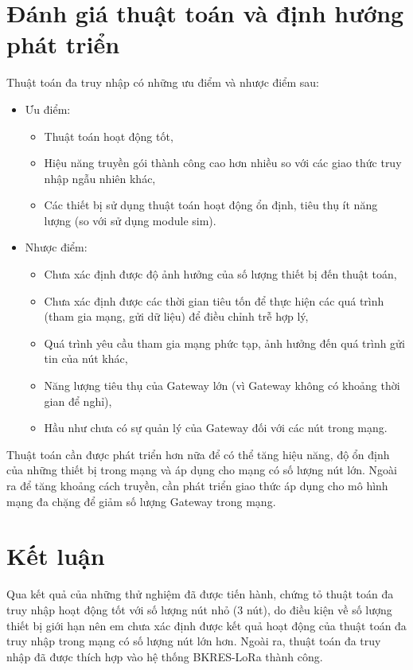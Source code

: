 \section{Đánh giá thuật toán và định hướng phát triển}
Thuật toán đa truy nhập có những ưu điểm và nhược điểm sau:
\begin{itemize}
\item Ưu điểm:
	\begin{itemize}
	\item	Thuật toán hoạt động tốt,
	\item	Hiệu năng truyền gói thành công cao hơn nhiều so với các giao thức truy nhập ngẫu nhiên khác,
	\item	Các thiết bị sử dụng thuật toán hoạt động ổn định, tiêu thụ ít năng lượng (so với sử dụng module sim).
	\end{itemize}
\item Nhược điểm:
	\begin{itemize}
	\item 	Chưa xác định được độ ảnh hưởng của số lượng thiết bị đến thuật toán,
	\item	Chưa xác định được các thời gian tiêu tốn để thực hiện các quá trình (tham gia mạng, gửi dữ liệu) để điều chỉnh trễ hợp lý,
	\item	Quá trình yêu cầu tham gia mạng phức tạp, ảnh hưởng đến quá trình gửi tin của nút khác,
	\item	Năng lượng tiêu thụ của Gateway lớn (vì Gateway không có khoảng thời gian để nghỉ),
	\item 	Hầu như chưa có sự quản lý của Gateway đối với các nút trong mạng.
	\end{itemize}
\end{itemize}
\par 
Thuật toán cần được phát triển hơn nữa để có thể tăng hiệu năng, độ ổn định của những thiết bị trong mạng và áp dụng cho mạng có số lượng nút lớn. Ngoài ra để tăng khoảng cách truyền, cần phát triển giao thức áp dụng cho mô hình mạng đa chặng để giảm số lượng Gateway trong mạng.
\section{Kết luận}
Qua kết quả của những thử nghiệm đã được tiến hành, chứng tỏ thuật toán đa truy nhập hoạt động tốt với số lượng nút nhỏ (3 nút), do điều kiện về số lượng thiết bị giới hạn nên em chưa xác định được kết quả hoạt động của thuật toán đa truy nhập trong mạng có số lượng nút lớn hơn. Ngoài ra, thuật toán đa truy nhập đã được thích hợp vào hệ thống BKRES-LoRa thành công.
